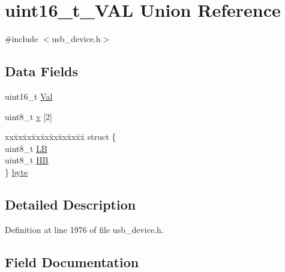 \hypertarget{unionuint16__t___v_a_l}{}\section{uint16\+\_\+t\+\_\+\+V\+AL Union Reference}
\label{unionuint16__t___v_a_l}


{\ttfamily \#include $<$usb\+\_\+device.\+h$>$}

\subsection*{Data Fields}
\begin{DoxyCompactItemize}
\item 
uint16\+\_\+t \mbox{\hyperlink{unionuint16__t___v_a_l_ac5c61e3f936b9c3554b06beb5961c12e}{Val}}
\item 
uint8\+\_\+t \mbox{\hyperlink{unionuint16__t___v_a_l_a81a08957904c562944b33d7d2ae4f42d}{v}} \mbox{[}2\mbox{]}
\item 
\begin{tabbing}
xx\=xx\=xx\=xx\=xx\=xx\=xx\=xx\=xx\=\kill
struct \{\\
\>uint8\_t \mbox{\hyperlink{unionuint16__t___v_a_l_aecc66fcbbc95a34cfd23bddac11a425d}{LB}}\\
\>uint8\_t \mbox{\hyperlink{unionuint16__t___v_a_l_ad741fe9900e35379cedd1deefa7ba84f}{HB}}\\
\} \mbox{\hyperlink{unionuint16__t___v_a_l_ad0806661f4ab5ad103c376ac88ccc02e}{byte}}\\

\end{tabbing}\end{DoxyCompactItemize}


\subsection{Detailed Description}


Definition at line 1976 of file usb\+\_\+device.\+h.



\subsection{Field Documentation}
\mbox{\label{unionuint16__t___v_a_l_ad0806661f4ab5ad103c376ac88ccc02e}} 
